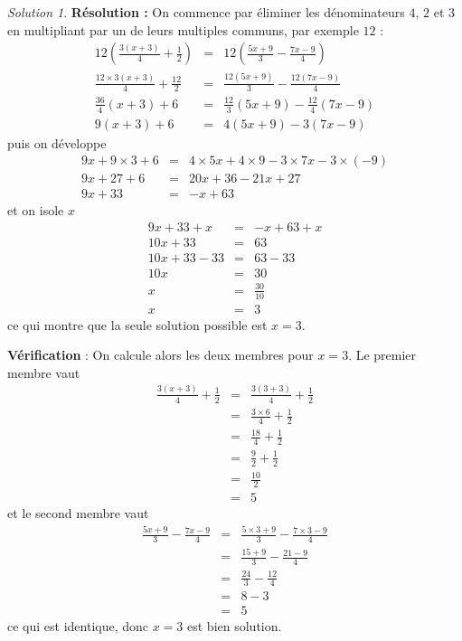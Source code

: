 \documentclass[14pt]{article}
\theoremstyle{remark}
\newtheorem*{sol}{Solution}
\newcounter{n}
\theoremstyle{plain}
\begin{document}
\begin{sol}
\textbf{Résolution :} On commence par éliminer les dénominateurs $4$, $2$ et $3$ en multipliant par un de leurs multiples communs, par exemple $12$ : 
\begin{eqnarray*}12\left(\frac{3(x+3)}4 + \frac12\right)
&=& 12\left(\frac{5x+9}3 - \frac{7x-9}4 \right)\\
\frac{12\times3(x+3)}4 + \frac{12}2 
&=& \frac{12(5x+9)}{3} - \frac{12(7x-9)}{4} \\
\frac{36}4 (x+3) + 6 &=& \frac{12}3(5x+9)- \frac{12}4(7x-9) \\
9(x+3) +6 &=& 4(5x+9) - 3(7x-9)
\end{eqnarray*} puis on développe
\begin{eqnarray*} 
9x+9\times 3 +6 &=& 4\times 5x+4\times 9 - 3\times 7x-3\times(-9) \\
9x + 27 + 6 &=& 20 x +36 -21x + 27\\
9x + 33 &=& -x + 63
\end{eqnarray*}et on isole $x$
\begin{eqnarray*}
9x + 33 +x&=& -x + 63+x\\
10x+33 &=& 63 \\
10x+33-33&=&63-33 \\
10x&=&30\\
x&=&\frac{30}{10}\\
x&=& 3
\end{eqnarray*}
ce qui montre que la seule solution possible est $x=3$. 

\textbf{Vérification} : On calcule alors les deux membres pour $x=3$. Le premier membre vaut 
\begin{eqnarray*}\frac{3(x+3)}4 + \frac12
&=& \frac{3(3+3)}4 + \frac12\\
&=& \frac{3\times6}4 + \frac12\\
&=& \frac{18}4 + \frac12\\
&=& \frac92+\frac12\\
&=& \frac{10}2\\
&=& 5
\end{eqnarray*}
et le second membre vaut 
\begin{eqnarray*}\frac{5x+9}3 - \frac{7x-9}4
&=& \frac{5\times 3+9}3 - \frac{7\times 3- 9}4 \\
&=& \frac{15+9}3 - \frac{21-9}4 \\
&=& \frac{24}3 - \frac{12}4 \\
&=& 8 - 3 \\
&=& 5
\end{eqnarray*} ce qui est identique, donc $x=3$ est bien solution.
\end{sol}
\end{document}
